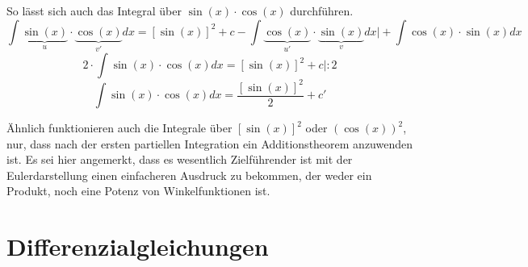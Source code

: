 \documentclass[
	11pt, %
]{beamer}
\begin{document}
\begin{frame}
	
	
	\begin{exampleblock}{So l\"asst sich auch das Integral \"uber $\sin(x)\cdot \cos(x)$ durchf\"uhren.}
		\begin{equation}
			\int \underbrace{\sin(x)}_{u}\cdot \underbrace{\cos(x)}_{v'}dx = [\sin(x)]^2+c-\int \underbrace{\cos(x)}_{u'}\cdot \underbrace{\sin(x)}_{v}dx\bigg| +\int \cos(x)\cdot \sin(x)dx
		\end{equation}
		\begin{equation}
			2\cdot \int \sin(x)\cdot \cos(x)dx = [\sin(x)]^2+c\bigg| :2
		\end{equation}
		\begin{equation}
			\int \sin(x)\cdot \cos(x)dx = \frac{[\sin(x)]^2}{2}+c'
		\end{equation}
	\end{exampleblock}
	\"Ahnlich funktionieren auch die Integrale \"uber $[\sin(x)]^2$ oder $(\cos(x))^2$, nur, dass nach der ersten partiellen Integration ein Additionstheorem anzuwenden ist. Es sei hier angemerkt, dass es wesentlich Zielf\"uhrender ist mit der Eulerdarstellung einen einfacheren Ausdruck zu bekommen, der weder ein Produkt, noch eine Potenz von Winkelfunktionen ist.
	
	
\end{frame}
\section{Differenzialgleichungen}
\end{document}
